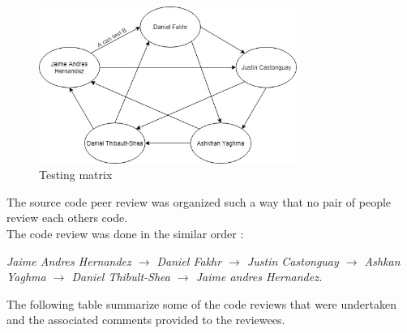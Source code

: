 \documentclass[a4paper]{article}
\begin{document}
\begin{figure}[!h]
\caption{Testing matrix}
\centering
\includegraphics[width=0.75\textwidth]{TestingMatrix}
\end{figure}

The source code peer review was organized such a way that no pair of people review each others code. \\

The code review was done in the similar order :

\medskip
\textit{Jaime Andres Hernandez $\rightarrow$ Daniel Fakhr $\rightarrow$ Justin Castonguay $\rightarrow$ Ashkan Yaghma $\rightarrow$ Daniel Thibult-Shea $\rightarrow$ Jaime andres Hernandez.}
\medskip

The following table summarize some of the code reviews that were undertaken and the associated comments provided to the reviewees.
\end{document}
